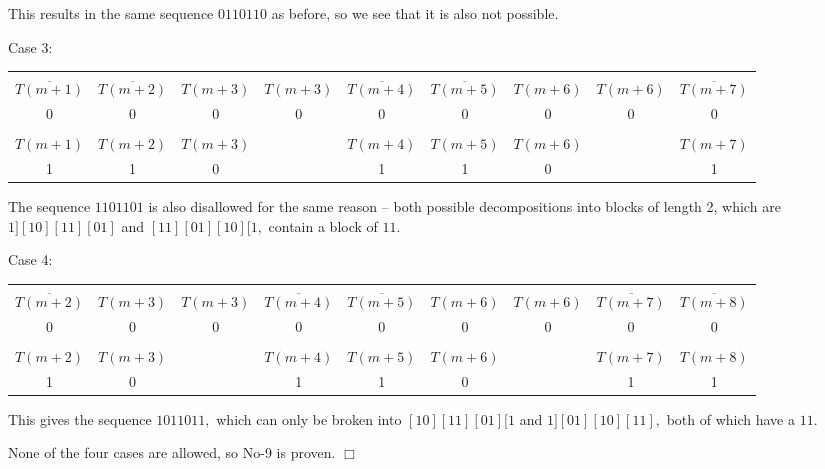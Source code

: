 \documentclass{article}
\begin{document}
This results in the same sequence $0110110$ as before, so we see that it is also not possible.

Case 3:

\begin{center}
\begin{tabular}{ |c|c|c|c|c|c|c|c|c| } 
 \hline
&&&&&&&&\\
$\overline{T(m+1)}$ & $\overline{T(m+2)}$ & $T(m+3)$ & $T(m+3)$ & $\overline{T(m+4)}$ & $\overline{T(m+5)}$ & $T(m+6)$ & $T(m+6)$ & $\overline{T(m+7)}$ \\ 
0 & 0 & 0 & 0 & 0 & 0 & 0 & 0 & 0 \\
\hline
&&&&&&&&\\
$T(m+1)$ & $T(m+2)$ & $T(m+3)$ & & $T(m+4)$ & $T(m+5)$ & $T(m+6)$ & & $T(m+7)$ \\
1 & 1 & 0 & & 1 & 1 & 0 & & 1 \\
 \hline
\end{tabular}
\end{center}

The sequence $1101101$ is also disallowed for the same reason -- both possible decompositions into blocks of length 2, which are $1][10][11][01]$ and $[11][01][10][1,$ contain a block of $11.$

Case 4:

\begin{center}
\begin{tabular}{ |c|c|c|c|c|c|c|c|c| } 
 \hline
&&&&&&&&\\
 $\overline{T(m+2)}$ & $T(m+3)$ & $T(m+3)$ & $\overline{T(m+4)}$ & $\overline{T(m+5)}$ & $T(m+6)$ & $T(m+6)$ & $\overline{T(m+7)}$ & $\overline{T(m+8)}$ \\ 
0 & 0 & 0 & 0 & 0 & 0 & 0 & 0 & 0 \\
\hline
&&&&&&&&\\
$T(m+2)$ & $T(m+3)$ & & $T(m+4)$ & $T(m+5)$ & $T(m+6)$ & & $T(m+7)$ & $T(m+8)$ \\
1 & 0 & & 1 & 1 & 0 & & 1 & 1 \\
 \hline
\end{tabular}
\end{center}

This gives the sequence $1011011,$ which can only be broken into $[10][11][01][1$ and $1][01][10][11],$ both of which have a $11.$

None of the four cases are allowed, so No-9 is proven. $\Box$
\end{document}
